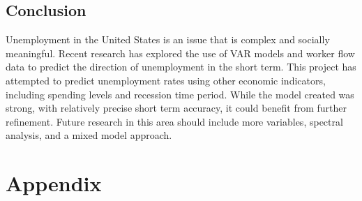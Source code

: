\documentclass[twoside,twocolumn]{article}
\begin{document}
\subsection{Conclusion}

Unemployment in the United States is an issue that is complex and socially meaningful. Recent research has explored the use of VAR models and worker flow data to predict the direction of unemployment in the short term. This project has attempted to predict unemployment rates using other economic indicators, including spending levels and recession time period. While the model created was strong, with relatively precise short term accuracy, it could benefit from further refinement. Future research in this area should include more variables, spectral analysis, and a mixed model approach.


\begin{flushleft}
\end{flushleft}
 \section*{Appendix}
 \appendix
\end{document}
